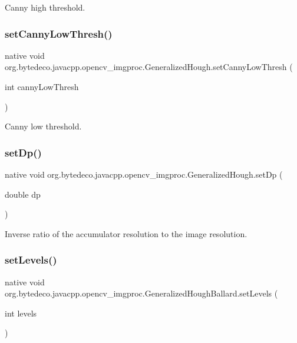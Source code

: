 Canny high threshold. \mbox{\label{group__imgproc_ga730f9badfb99e9689367d51afa76ef94}} 
\subsubsection{\texorpdfstring{set\+Canny\+Low\+Thresh()}{setCannyLowThresh()}}
{\footnotesize\ttfamily native void org.\+bytedeco.\+javacpp.\+opencv\+\_\+imgproc.\+Generalized\+Hough.\+set\+Canny\+Low\+Thresh (\begin{DoxyParamCaption}\item[{int}]{canny\+Low\+Thresh }\end{DoxyParamCaption})}

Canny low threshold. \mbox{\label{group__imgproc_ga08c264185f923eab1e7b28a97c8a99ae}} 
\subsubsection{\texorpdfstring{set\+Dp()}{setDp()}}
{\footnotesize\ttfamily native void org.\+bytedeco.\+javacpp.\+opencv\+\_\+imgproc.\+Generalized\+Hough.\+set\+Dp (\begin{DoxyParamCaption}\item[{double}]{dp }\end{DoxyParamCaption})}

Inverse ratio of the accumulator resolution to the image resolution. \mbox{\label{group__imgproc_ga08916f9b4499b2356dd542266564dec0}} 
\subsubsection{\texorpdfstring{set\+Levels()}{setLevels()}\hspace{0.1cm}{\footnotesize\ttfamily [1/2]}}
{\footnotesize\ttfamily native void org.\+bytedeco.\+javacpp.\+opencv\+\_\+imgproc.\+Generalized\+Hough\+Ballard.\+set\+Levels (\begin{DoxyParamCaption}\item[{int}]{levels }\end{DoxyParamCaption})}

